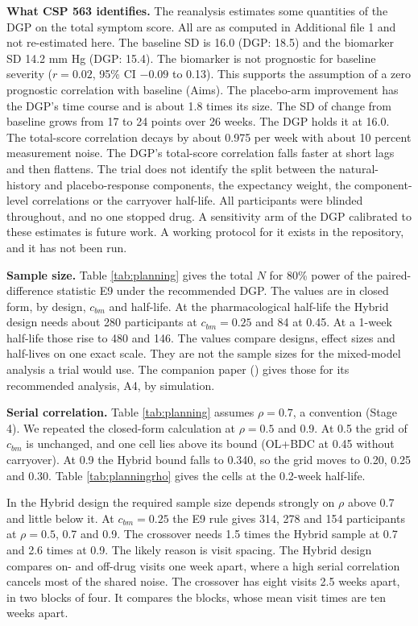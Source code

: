 \documentclass[
  11pt,
]{article}
\begin{document}
\textbf{What CSP 563 identifies.} The reanalysis estimates some quantities
of the DGP on the total symptom score. All are as computed in
Additional file 1 and not re-estimated here. The baseline SD is 16.0
(DGP: 18.5) and the biomarker SD 14.2 mm Hg (DGP: 15.4). The biomarker
is not prognostic for baseline severity (\(r = 0.02\), 95\% CI \(-0.09\) to
0.13). This supports the assumption of a zero prognostic correlation
with baseline (Aims). The placebo-arm improvement has the DGP's time
course and is about 1.8 times its size. The SD of change from
baseline grows from 17 to 24 points over 26 weeks. The DGP holds it
at 16.0. The total-score
correlation decays by about 0.975 per week with about 10 percent
measurement noise. The DGP's total-score correlation falls faster at
short lags and then flattens. The trial does not identify the split
between the natural-history and placebo-response components, the
expectancy weight, the component-level correlations or the carryover
half-life. All participants were blinded throughout, and no one
stopped drug. A sensitivity arm of the DGP calibrated to these
estimates is future work. A working protocol for it exists in the
repository, and it has not been run.

\textbf{Sample size.} Table \ref{tab:planning} gives the total \(N\) for 80\%
power of the paired-difference statistic E9 under the recommended
DGP. The values are in closed form, by design, \(c_{bm}\) and
half-life. At the pharmacological half-life the Hybrid design needs
about 280
participants at \(c_{bm} = 0.25\) and 84 at 0.45. At a 1-week half-life
those rise to 480 and 146. The values compare designs, effect sizes
and half-lives on one exact scale. They are not the sample sizes for
the mixed-model analysis a trial would use. The companion paper
() gives those for its recommended analysis, A4,
by simulation.

\textbf{Serial correlation.} Table \ref{tab:planning} assumes
\(\rho = 0.7\), a convention (Stage 4). We repeated the closed-form
calculation at \(\rho = 0.5\) and 0.9. At 0.5 the grid of \(c_{bm}\) is
unchanged, and one cell lies above its bound (OL+BDC at 0.45 without
carryover). At 0.9 the Hybrid bound falls to 0.340,
so the grid moves to 0.20, 0.25 and 0.30. Table
\ref{tab:planningrho} gives the cells at the 0.2-week half-life.

In the Hybrid design the required sample size depends strongly on
\(\rho\) above 0.7 and little below it. At \(c_{bm} = 0.25\) the E9 rule
gives 314, 278
and 154 participants at \(\rho = 0.5\), 0.7
and 0.9. The crossover needs 1.5 times the Hybrid sample
at 0.7 and 2.6 times at 0.9. The likely reason is visit
spacing. The Hybrid design compares on- and off-drug visits one week
apart, where a high serial correlation cancels most of the shared
noise. The crossover has eight visits 2.5 weeks apart, in two blocks
of four. It compares the blocks, whose mean visit times are ten weeks
apart.
\end{document}
